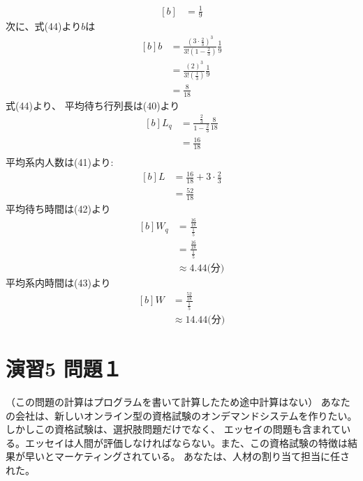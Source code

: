 \documentclass{report}
\begin{document}
\begin{CJK}{UTF8}{min}
\begin{equation}
\begin{aligned}[b]
                & =\frac{1}{9}
        \end{aligned}
    \end{equation}
    次に、式(44)より$b$は
    \begin{equation}
        \begin{aligned}[b]
            b & =\frac{(3\cdot\frac{2}{3})^3}{3!(1-\frac{2}{3})}\frac{1}{9} \\
              & =\frac{(2)^3}{3!(\frac{1}{3})}\frac{1}{9}                   \\
              & =\frac{8}{18}
        \end{aligned}
    \end{equation}
    式(44)より、
    平均待ち行列長は(40)より
    \begin{equation}
        \begin{aligned}[b]
            L_q & =\frac{\frac{2}{3}}{1-\frac{2}{3}}\frac{8}{18} \\
                & =\frac{16}{18}                                 \\
        \end{aligned}
    \end{equation}
    平均系内人数は(41)より:
    \begin{equation}
        \begin{aligned}[b]
            L & =\frac{16}{18}+3\cdot\frac{2}{3} \\
              & =\frac{52}{18}
        \end{aligned}
    \end{equation}
    平均待ち時間は(42)より
    \begin{equation}
        \begin{aligned}[b]
            W_q & =\frac{\frac{16}{18}}{\frac{1}{5}} \\
                & =\frac{\frac{16}{18}}{\frac{1}{5}} \\
                & \approx 4.44 \text{(分)}
        \end{aligned}
    \end{equation}
    平均系内時間は(43)より
    \begin{equation}
        \begin{aligned}[b]
            W & =\frac{\frac{52}{18}}{\frac{1}{5}} \\
            & \approx 14.44\text{(分)}
        \end{aligned}
    \end{equation}

    \newpage
    \section*{演習5 問題１}
    （この問題の計算はプログラムを書いて計算したため途中計算はない）
    あなたの会社は、新しいオンライン型の資格試験のオンデマンドシステムを作りたい。しかしこの資格試験は、選択肢問題だけでなく、
    エッセイの問題も含まれている。エッセイは人間が評価しなければならない。また、この資格試験の特徴は結果が早いとマーケティングされている。
    あなたは、人材の割り当て担当に任された。\\


\end{CJK}
\end{document}
